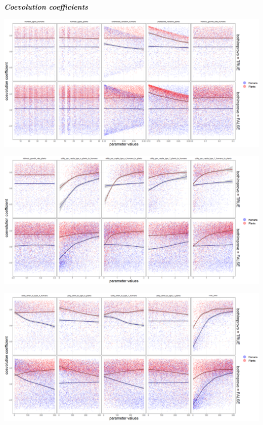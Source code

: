 \documentclass[
]{book}
\begin{document}

\textbf{\emph{Coevolution coefficients}}

\includegraphics[width=1\linewidth]{plots/5_LHS_bothImprove_coevolution_coefficients_bifurcationPlot_twoVariables_per_parameter_and_scenario_part1}

\includegraphics[width=1\linewidth]{plots/5_LHS_bothImprove_coevolution_coefficients_bifurcationPlot_twoVariables_per_parameter_and_scenario_part2}

\includegraphics[width=1\linewidth]{plots/5_LHS_bothImprove_coevolution_coefficients_bifurcationPlot_twoVariables_per_parameter_and_scenario_part3}
\end{document}
